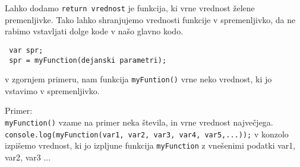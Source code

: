 Lahko dodamo  \texttt{return vrednost} je funkcija, ki vrne vrednost želene premenljivke.
Tako lahko shranjujemo vrednosti funkcije v spremenljivko, da ne rabimo vstavljati dolge kode v našo glavno kodo.

\begin{verbatim}
 var spr;
 spr = myFunction(dejanski parametri);
\end{verbatim}
v zgornjem primeru, nam funkcija \texttt{myFuntion()} vrne neko vrednost, ki jo vstavimo v spremenljivko.

Primer:\\
\texttt{myFunction()} vzame na primer neka števila, in vrne vrednost največjega.
\texttt{console.log(myFunction(var1, var2, var3, var4, var5,...));} v konzolo izpišemo vrednost, ki jo izpljune funkcija \texttt{myFunction} z vnešenimi podatki var1, var2, var3 ...